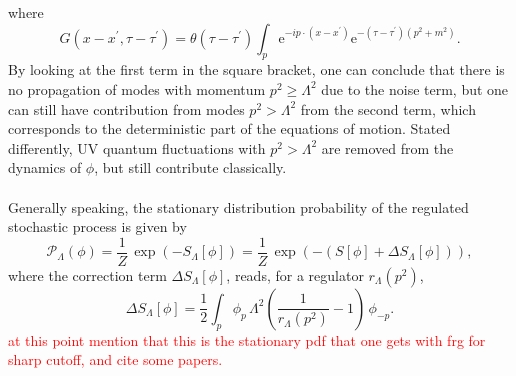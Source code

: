 where
\begin{equation*}
    G\left(x-x^{\prime}, \tau-\tau^{\prime}\right) =\theta\left(\tau-\tau^{\prime}\right) \int_p \mathrm{e}^{-i p \cdot\left(x-x^{\prime}\right)} \mathrm{e}^{-\left(\tau-\tau^{\prime}\right)\left(p^2+m^2\right)}.
\end{equation*}
By looking at the first term in the square bracket, one can conclude that there is no propagation of modes with momentum $p^2\geq \Lambda^2$ due to the noise term, but one can still have contribution from modes $p^2 > \Lambda^2$ from the second term, which corresponds to the deterministic part of the equations of motion. Stated differently, UV quantum fluctuations with $p^2 > \Lambda^2$ are removed from the dynamics of $\phi$, but still contribute classically. \\~\\
Generally speaking, the stationary distribution probability of the regulated stochastic process is given by \cite{Pawlowski2017CoolingNoise}
\begin{equation}
    \mathcal{P}_\Lambda(\phi) = \frac{1}{Z} \, \exp\left(-S_\Lambda[\phi]\right) = \frac{1}{Z} \, \exp\left(-(S[\phi] + \Delta S_\Lambda[\phi])\right),
    \label{eq:probability_field_configuration_regularised}
\end{equation}
where the correction term $\Delta S_\Lambda[\phi]$, reads, for a regulator $r_\Lambda(p^2)$,
\begin{equation*}
        \Delta S_{\Lambda}[\phi]=\frac{1}{2} \int_p \phi_p \, \Lambda^2\left(\frac{1}{r_{\Lambda}\left(p^2\right)}-1\right) \, \phi_{-p}.
\end{equation*}
\textcolor{red}{at this point mention that this is the stationary pdf that one gets with frg for sharp cutoff, and cite some papers.}


